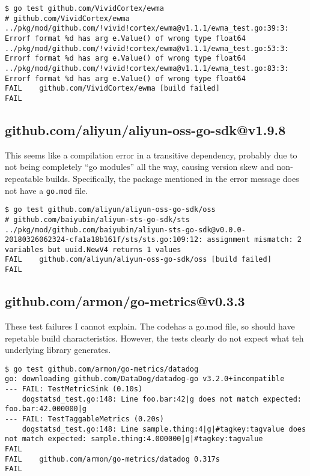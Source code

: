 \documentclass[a4paper]{paper}
\begin{document}
\begin{verbatim}
$ go test github.com/VividCortex/ewma
# github.com/VividCortex/ewma
../pkg/mod/github.com/!vivid!cortex/ewma@v1.1.1/ewma_test.go:39:3: Errorf format %d has arg e.Value() of wrong type float64
../pkg/mod/github.com/!vivid!cortex/ewma@v1.1.1/ewma_test.go:53:3: Errorf format %d has arg e.Value() of wrong type float64
../pkg/mod/github.com/!vivid!cortex/ewma@v1.1.1/ewma_test.go:83:3: Errorf format %d has arg e.Value() of wrong type float64
FAIL	github.com/VividCortex/ewma [build failed]
FAIL
\end{verbatim}

\subsection{github.com/aliyun/aliyun-oss-go-sdk@v1.9.8}

This seems like a compilation error in a transitive dependency,
probably due to not being completely ``go modules'' all the way,
causing version skew and non-repeatable builds. Specifically, the
package mentioned in the error message does not have a {\tt go.mod}
file.

\begin{verbatim}
$ go test github.com/aliyun/aliyun-oss-go-sdk/oss
# github.com/baiyubin/aliyun-sts-go-sdk/sts
../pkg/mod/github.com/baiyubin/aliyun-sts-go-sdk@v0.0.0-20180326062324-cfa1a18b161f/sts/sts.go:109:12: assignment mismatch: 2 variables but uuid.NewV4 returns 1 values
FAIL	github.com/aliyun/aliyun-oss-go-sdk/oss [build failed]
FAIL
\end{verbatim}

\subsection{github.com/armon/go-metrics@v0.3.3}

These test failures I cannot explain. The codehas a go.mod file, so
should have repetable build characteristics. However, the tests
clearly do not expect what teh underlying library generates.

\begin{verbatim}
$ go test github.com/armon/go-metrics/datadog
go: downloading github.com/DataDog/datadog-go v3.2.0+incompatible
--- FAIL: TestMetricSink (0.10s)
    dogstatsd_test.go:148: Line foo.bar:42|g does not match expected: foo.bar:42.000000|g
--- FAIL: TestTaggableMetrics (0.20s)
    dogstatsd_test.go:148: Line sample.thing:4|g|#tagkey:tagvalue does not match expected: sample.thing:4.000000|g|#tagkey:tagvalue
FAIL
FAIL	github.com/armon/go-metrics/datadog	0.317s
FAIL
\end{verbatim}
\end{document}

